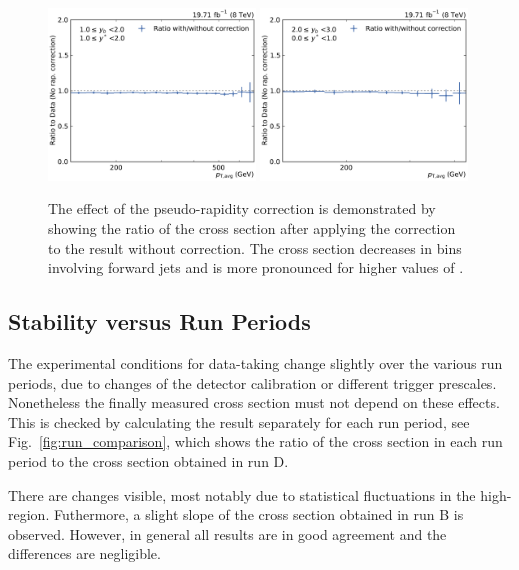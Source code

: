 \begin{figure}[htbp]
    \includegraphics[width=0.49\textwidth]{figures/measurement/rap_corr_data_yb1ys1.pdf}\hfill
    \includegraphics[width=0.49\textwidth]{figures/measurement/rap_corr_data_yb2ys0.pdf}
    \caption[Effect of pseudo-rapidity correction]{The effect of the
        pseudo-rapidity correction is demonstrated by showing the ratio of the
        cross section after applying the correction to the result without
        correction. The cross section decreases in bins involving forward jets
        and is more pronounced for higher values of \ystar.}
    \label{fig:rap_corr_data}
\end{figure}

\subsection{Stability versus Run Periods}

The experimental conditions for data-taking change slightly over the various run
periods, due to changes of the detector calibration or different trigger
prescales. Nonetheless the finally measured cross section must not depend on
these effects. This is checked by calculating the result separately for each run
period, see Fig.~\ref{fig:run_comparison}, which shows the ratio of the cross
section in each run period to the cross section obtained in run D. 

There are changes visible, most notably due to statistical fluctuations in the
high-\pt region. Futhermore, a slight slope of the cross section obtained in run
B is observed. However, in general all results are in good agreement and the
differences are negligible.

